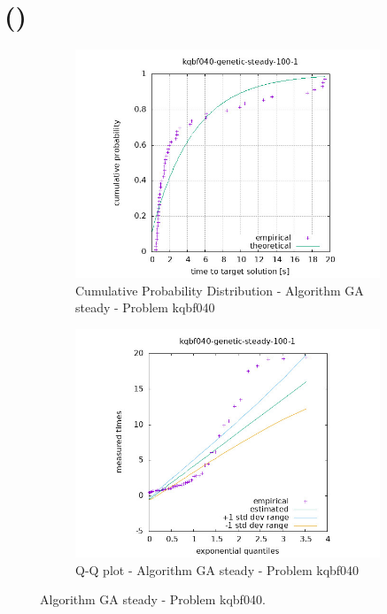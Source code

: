 \section{\tttfull (\ttt)}
\label{appendix:ttt-plot}

\begin{figure}[H]
    \centering
    \begin{subfigure}{0.49\textwidth}
        \includegraphics[width=\textwidth]{figure/ttt_plot/kqbf040-genetic-steady-100-1-exp.jpeg}
        \caption{Cumulative Probability Distribution - Algorithm GA steady - Problem kqbf040}
        \label{fig:ga-steady-kqbf040-exp}
    \end{subfigure}
    \hfill
    \begin{subfigure}{0.49\textwidth}
        \includegraphics[width=\textwidth]{figure/ttt_plot/kqbf040-genetic-steady-100-1-qq.jpeg}
        \caption{Q-Q plot - Algorithm GA steady - Problem kqbf040}
        \label{fig:ga-steady-kqbf040-qq}
    \end{subfigure}
    \caption{Algorithm GA steady - Problem kqbf040.}
    \label{fig:ga-steady-kqbf040}
\end{figure}



